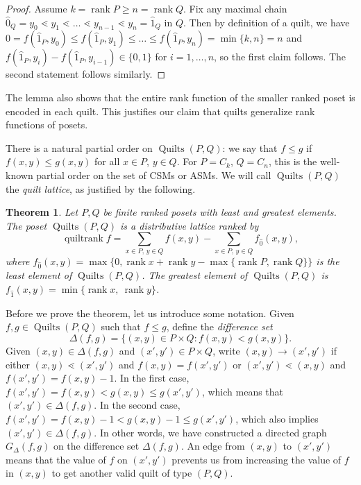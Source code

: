 \documentclass[12pt]{amsart}
\numberwithin{equation}{section}
\newtheorem{theorem}{Theorem}[section]
\theoremstyle{definition}
\newcommand{\quilt}{\operatorname{Quilts}}
\DeclareMathOperator{\rk}{quiltrank}
\newcommand{\rank}{\operatorname{rank}}
\begin{document}
\begin{proof}
Assume $k = \rank P \geq n = \rank Q$.  Fix any maximal chain $\hat 0_Q = y_0 \lessdot
y_1 \lessdot \dots \lessdot y_{n-1} \lessdot y_n = \hat 1_Q$ in
$Q$. Then by definition of a quilt, we have $0 = f(\hat 1_P,y_0) \leq
f(\hat 1_P,y_1) \leq \dots \leq f(\hat 1_P,y_n) = \min\{k,n\} = n$ and $f(\hat
1_P,y_i) - f(\hat 1_P,y_{i-1}) \in \{0,1\}$ for $i = 1,\ldots,n$, so
the first claim follows.  The second statement follows similarly. 
\end{proof}

The lemma also shows that the entire rank function of the smaller ranked
poset is encoded in each quilt.  This justifies our claim that quilts
generalize rank functions of posets. 

\bigskip

 There is a natural partial order on $\quilt(P,Q)$: we say that $f \leq g$ if $f(x,y) \leq g(x,y)$ for all $x \in P$, $y \in Q$. For $P = C_k$, $Q = C_n$, this is the well-known partial order on the set of CSMs or ASMs. We will call $\quilt(P,Q)$ the \emph{quilt lattice}, as justified by the following.

\begin{theorem} \label{thm:lattice}
Let $P,Q$ be finite ranked posets with least and greatest elements.
The poset $\quilt(P,Q)$ is a distributive lattice ranked by $$\rk f =
\sum_{x \in P,\, y \in Q} f(x,y) - \sum_{x \in P,\, y \in Q} f_{\hat
0}(x,y),$$ where $f_{\hat 0}(x,y) = \max\{0,\rank x + \rank y -
\max\{\rank P,\rank Q\}\}$ is the least element of $\quilt(P,Q)$. The greatest
element of $\quilt(P,Q)$ is $f_{\hat 1}(x,y) = \min\{\rank x,\ \rank
y\}$.
\end{theorem}

Before we prove the theorem, let us introduce some notation. Given
$f,g \in \quilt(P,Q)$ such that $f \leq g$, define the \emph{difference set}
\begin{equation}\label{eq:difference.set}
\Delta(f,g) = \{(x,y) \in P \times Q \colon f(x,y) < g(x,y) \}.
\end{equation}
Given $(x,y) \in \Delta(f,g)$ and $(x',y') \in P \times Q$, write
$(x,y) \to (x',y')$ if either $(x,y) \lessdot (x',y')$ and $f(x,y) =
f(x',y')$ or $(x',y') \lessdot (x,y)$ and $f(x',y') = f(x,y) - 1$. In
the first case, $f(x',y') = f(x,y) < g(x,y) \leq g(x',y')$, which
means that $(x',y') \in \Delta(f,g)$. In the second case, $f(x',y') =
f(x,y) - 1 < g(x,y) - 1 \leq g(x',y')$, which also implies $(x',y')
\in \Delta(f,g)$. In other words, we have constructed a directed graph
$G_\Delta(f,g)$ on the difference set $\Delta(f,g)$. An edge from $(x,y)$ to
$(x',y')$ means that the value of $f$ on $(x',y')$ prevents us from
increasing the value of $f$ in $(x,y)$ to get another valid quilt of
type $(P,Q)$.
\end{document}

